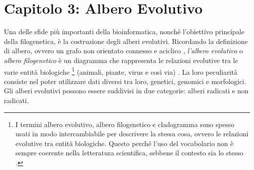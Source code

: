 \chapter{Capitolo 3: Albero Evolutivo}
Una delle sfide più importanti della bioinformatica, nonché l'obiettivo principale della filogenetica, è la costruzione degli alberi evolutivi.
\newline
Ricordando la definizione di albero, ovvero un grafo non orientato connesso e aciclico \cite{algoritmiEStruttureDati2}, \textit{l'albero evolutivo} o \textit{albero filogenetico} è un diagramma che rappresenta le relazioni evolutive tra le varie entità biologiche \footnote{I termini albero evolutivo, albero filogenetico e cladogramma sono spesso usati in modo intercambiabile per descrivere la stessa cosa, ovvero le relazioni evolutive tra entità biologiche. Questo perché l'uso del vocabolario non è sempre coerente nella letteratura scientifica, sebbene il contesto sia lo stesso \cite{bioinformaticsforbeginner}.} (animali, piante, virus e così via) \cite{buildingaphylogenictree}. La loro peculiarità consiste nel poter utilizzare dati diversi tra loro,  genetici, genomici e morfologici.
\newline
Gli alberi evolutivi possono essere suddivisi in due categorie: alberi radicati e non radicati.

